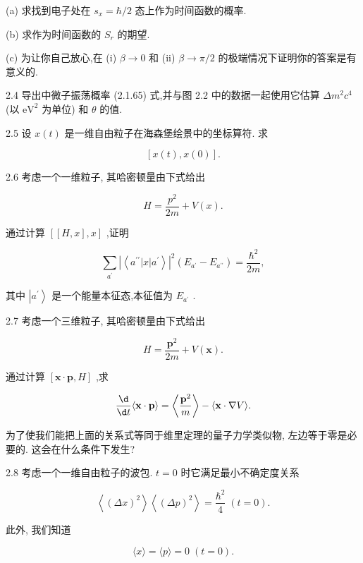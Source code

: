 (a) 求找到电子处在 ${s}_{x} = \hbar /2$ 态上作为时间函数的概率.

(b) 求作为时间函数的 ${S}_{r}$ 的期望.

(c) 为让你自己放心,在 (i) $\beta \rightarrow 0$ 和 (ii) $\beta \rightarrow \pi /2$ 的极端情况下证明你的答案是有意义的.

2.4 导出中微子振荡概率 (2.1.65) 式,并与图 2.2 中的数据一起使用它估算 $\Delta {m}^{2}{c}^{4}$ (以 ${\mathrm{{eV}}}^{2}$ 为单位) 和 $\theta$ 的值.

2.5 设 $x\left( t\right)$ 是一维自由粒子在海森堡绘景中的坐标算符. 求

$$
\left\lbrack {x\left( t\right), x\left( 0\right) }\right\rbrack \text{.}
$$

2.6 考虑一个一维粒子, 其哈密顿量由下式给出

$$
H = \frac{{p}^{2}}{2m} + V\left( x\right) .
$$

通过计算 $\left\lbrack {\left\lbrack {H, x}\right\rbrack, x}\right\rbrack$ ,证明

$$
\mathop{\sum }\limits_{{a}^{\prime }}{\left| \left\langle {a}^{\prime \prime }\left| x\right| {a}^{\prime }\right\rangle \right| }^{2}\left( {{E}_{{a}^{\prime }} - {E}_{{a}^{\prime \prime }}}\right) = \frac{{\hbar }^{2}}{2m},
$$

其中 $\left| {a}^{\prime }\right\rangle$ 是一个能量本征态,本征值为 ${E}_{{a}^{\prime }}$ .

2.7 考虑一个三维粒子, 其哈密顿量由下式给出

$$
H = \frac{{\mathbf{p}}^{2}}{2m} + V\left( \mathbf{x}\right) .
$$

通过计算 $\left\lbrack {\mathbf{x} \cdot \mathbf{p}, H}\right\rbrack$ ,求

$$
\frac{\d}{\d t}\langle \mathbf{x} \cdot \mathbf{p}\rangle = \left\langle \frac{{\mathbf{p}}^{2}}{m}\right\rangle - \langle \mathbf{x} \cdot \nabla V\rangle .
$$

为了使我们能把上面的关系式等同于维里定理的量子力学类似物, 左边等于零是必要的. 这会在什么条件下发生?

2.8 考虑一个一维自由粒子的波包. $t = 0$ 时它满足最小不确定度关系

$$
\left\langle {\left( \Delta x\right) }^{2}\right\rangle \left\langle {\left( \Delta p\right) }^{2}\right\rangle = \frac{{\hbar }^{2}}{4}\;\left( {t = 0}\right) .
$$

此外, 我们知道

$$
\langle x\rangle = \langle p\rangle = 0\;\left( {t = 0}\right) .
$$

